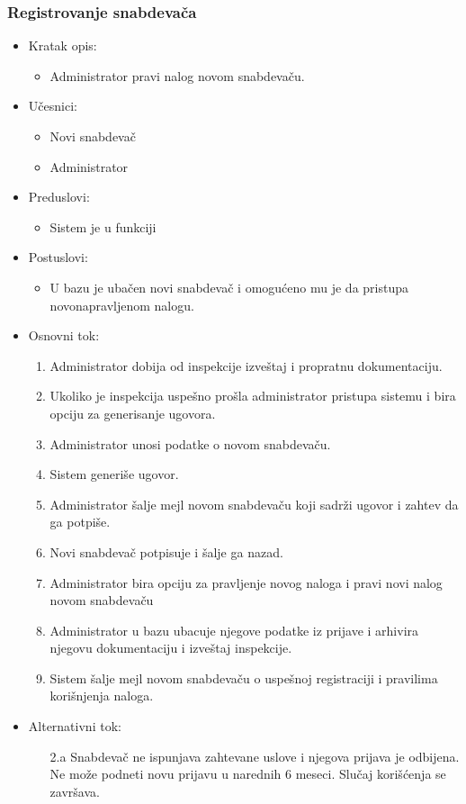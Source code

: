 \subsubsection{Registrovanje snabdevača}

\begin{itemize}
	\item Kratak opis:
		\begin{itemize}
			\item Administrator pravi nalog novom snabdevaču.
		\end{itemize}
	\item Učesnici:
		\begin{itemize}
			\item Novi snabdevač
			\item Administrator
		\end{itemize}				
	\item Preduslovi:
		\begin{itemize}
		    \item Sistem je u funkciji
		\end{itemize}
	\item Postuslovi:
		\begin{itemize}
			\item U bazu je ubačen novi snabdevač i omogućeno mu je da pristupa novonapravljenom nalogu.
		\end{itemize}		
	\item Osnovni tok:
		\begin{enumerate}
		    \item Administrator dobija od inspekcije izveštaj i propratnu dokumentaciju.
		    \item Ukoliko je inspekcija uspešno prošla administrator pristupa sistemu i bira opciju za generisanje ugovora. 
		    \item Administrator unosi podatke o novom snabdevaču. 
		    \item Sistem generiše ugovor.
		    \item Administrator šalje mejl novom snabdevaču koji sadrži ugovor i zahtev da ga potpiše.
		    \item Novi snabdevač potpisuje i šalje ga nazad.
		    \item Administrator bira opciju za pravljenje novog naloga i pravi novi nalog novom snabdevaču
		    \item Administrator u bazu ubacuje njegove podatke iz prijave i arhivira njegovu dokumentaciju i izveštaj inspekcije.
		    \item Sistem šalje mejl novom snabdevaču o uspešnoj registraciji i pravilima korišnjenja naloga.
		\end{enumerate}
	\item Alternativni tok:
		\begin{itemize}
			 \item[2.a] Snabdevač ne ispunjava zahtevane uslove i njegova prijava je odbijena. Ne može podneti novu prijavu u narednih 6 meseci. Slučaj korišćenja se završava.
	

\end{itemize}
\end{itemize}
